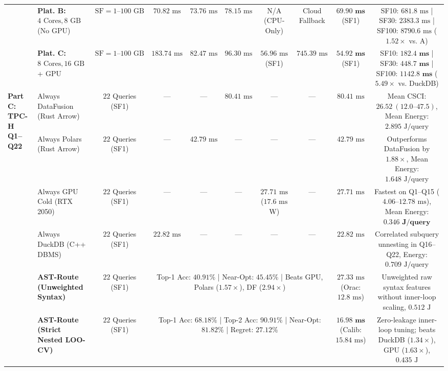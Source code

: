 \documentclass[10pt,a4paper]{article}
\begin{document}
\begin{table}[t!]
{\begin{tabular}{@{}llcccccccc@{}}
 & \textbf{Plat. B:} $4\text{ Cores}, 8\text{ GB}$ (No GPU) & $\text{SF}=1\text{--}100\text{ GB}$ & $70.82\text{ ms}$ & $73.76\text{ ms}$ & $78.15\text{ ms}$ & N/A (CPU-Only) & Cloud Fallback & $\mathbf{69.90\text{ ms}}$ (SF1) & SF10: $681.8\text{ ms}$ | SF30: $2383.3\text{ ms}$ | SF100: $8790.6\text{ ms}$ ($\mathbf{1.52\times}$ vs. A) \\
 & \textbf{Plat. C:} $8\text{ Cores}, 16\text{ GB}$ + GPU & $\text{SF}=1\text{--}100\text{ GB}$ & $183.74\text{ ms}$ & $82.47\text{ ms}$ & $96.30\text{ ms}$ & $56.96\text{ ms}$ (SF1) & $745.39\text{ ms}$ & $\mathbf{54.92\text{ ms}}$ (SF1) & SF10: $\mathbf{182.4\text{ ms}}$ | SF30: $\mathbf{448.7\text{ ms}}$ | SF100: $\mathbf{1142.8\text{ ms}}$ ($\mathbf{5.49\times}$ vs. DuckDB) \\
\midrule
\multirow{6}{*}{\textbf{Part C: TPC-H Q1--Q22}}
 & Always DataFusion (Rust Arrow) & $22$ Queries (SF1) & --- & --- & $80.41\text{ ms}$ & --- & --- & $80.41\text{ ms}$ & Mean CSCI: $26.52\ (12.0\text{--}47.5)$, Mean Energy: $2.895\text{ J/query}$ \\
 & Always Polars (Rust Arrow) & $22$ Queries (SF1) & --- & $42.79\text{ ms}$ & --- & --- & --- & $42.79\text{ ms}$ & Outperforms DataFusion by $1.88\times$, Mean Energy: $1.648\text{ J/query}$ \\
 & Always GPU Cold (RTX 2050) & $22$ Queries (SF1) & --- & --- & --- & $27.71\text{ ms}$ ($17.6\text{ ms}$ W) & --- & $27.71\text{ ms}$ & Fastest on Q1--Q15 ($4.06\text{--}12.78\text{ ms}$), Mean Energy: $\mathbf{0.346\text{ J/query}}$ \\
 & Always DuckDB (C++ DBMS) & $22$ Queries (SF1) & $22.82\text{ ms}$ & --- & --- & --- & --- & $22.82\text{ ms}$ & Correlated subquery unnesting in Q16--Q22, Energy: $0.709\text{ J/query}$ \\
 & \textbf{AST-Route (Unweighted Syntax)} & $22$ Queries (SF1) & \multicolumn{5}{c}{Top-1 Acc: $40.91\%$ | Near-Opt: $45.45\%$ | Beats GPU, Polars ($1.57\times$), DF ($2.94\times$)} & $27.33\text{ ms}$ (Orac: $12.8\text{ ms}$) & Unweighted raw syntax features without inner-loop scaling, $0.512\text{ J}$ \\
 & \textbf{AST-Route (Strict Nested LOO-CV)} & $22$ Queries (SF1) & \multicolumn{5}{c}{Top-1 Acc: $\mathbf{68.18\%}$ | Top-2 Acc: $\mathbf{90.91\%}$ | Near-Opt: $\mathbf{81.82\%}$ | Regret: $\mathbf{27.12\%}$} & $\mathbf{16.98\text{ ms}}$ (Calib: $15.84\text{ ms}$) & Zero-leakage inner-loop tuning; beats DuckDB ($1.34\times$), GPU ($1.63\times$), $0.435\text{ J}$ \\

\end{tabular}}
\end{table}
\end{document}
